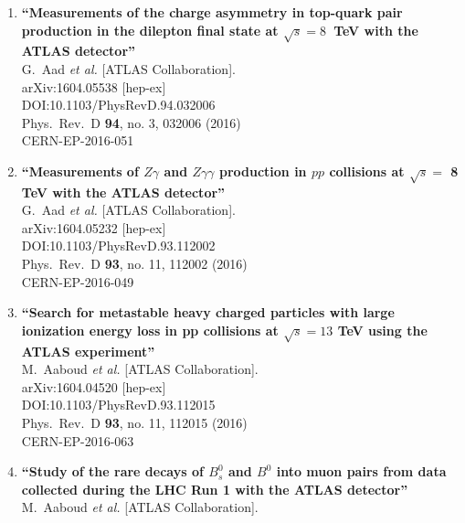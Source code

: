 \documentclass{article}
\begin{document}
\begin{enumerate}
\item%
{\bf ``Measurements of the charge asymmetry in top-quark pair production in the dilepton final state at $\sqrt{s}=8$  TeV with the ATLAS detector''}
  \\{}G.~Aad {\it et al.} [ATLAS Collaboration].
  \\{}arXiv:1604.05538 [hep-ex]
  \\{}DOI:10.1103/PhysRevD.94.032006
  \\{}Phys.\ Rev.\ D {\bf 94}, no. 3, 032006 (2016)
  \\{}CERN-EP-2016-051
\item%
{\bf ``Measurements of $Z\gamma$ and $Z\gamma\gamma$ production in $pp$ collisions at $\sqrt{s}=$ 8 TeV with the ATLAS detector''}
  \\{}G.~Aad {\it et al.} [ATLAS Collaboration].
  \\{}arXiv:1604.05232 [hep-ex]
  \\{}DOI:10.1103/PhysRevD.93.112002
  \\{}Phys.\ Rev.\ D {\bf 93}, no. 11, 112002 (2016)
  \\{}CERN-EP-2016-049
\item%
{\bf ``Search for metastable heavy charged particles with large ionization energy loss in pp collisions at $\sqrt{s} = 13$ TeV using the ATLAS experiment''}
  \\{}M.~Aaboud {\it et al.} [ATLAS Collaboration].
  \\{}arXiv:1604.04520 [hep-ex]
  \\{}DOI:10.1103/PhysRevD.93.112015
  \\{}Phys.\ Rev.\ D {\bf 93}, no. 11, 112015 (2016)
  \\{}CERN-EP-2016-063
\item%
{\bf ``Study of the rare decays of $B^0_s$ and $B^0$ into muon pairs from data collected during the LHC Run 1 with the ATLAS detector''}
  \\{}M.~Aaboud {\it et al.} [ATLAS Collaboration].

\end{enumerate}
\end{document}
